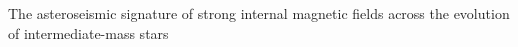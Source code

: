 The asteroseismic signature of strong internal magnetic fields across the evolution of intermediate-mass stars
  
  
  